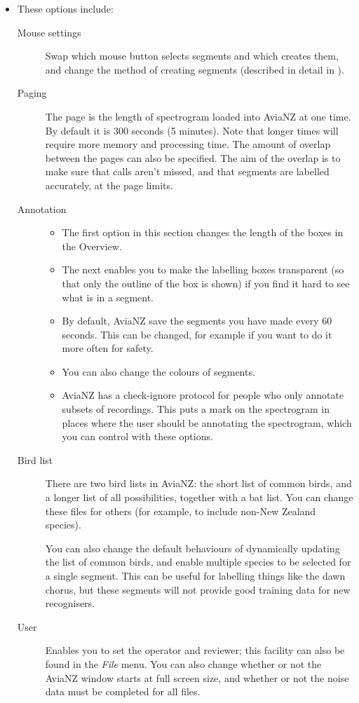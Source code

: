 \documentclass{scrartcl}
\begin{document}
\begin{itemize}
\item These options include:
\begin{description}
	\item[Mouse settings] Swap which mouse button selects segments and which creates them, and change the method of creating segments (described in detail in ).
\item[Paging] The page is the length of spectrogram loaded into AviaNZ at one time. By default it is 300 seconds (5 minutes). Note that longer times will require more memory and processing time. The amount of overlap between the pages can also be specified. The aim of the overlap is to make sure that calls aren't missed, and that segments are labelled accurately, at the page limits. 
\item[Annotation] 
\begin{itemize}
\item The first option in this section changes the length of the boxes in the Overview. 
\item The next enables you to make the labelling boxes transparent (so that only the outline of the box is shown) if you find it hard to see what is in a segment. 
\item By default, AviaNZ save the segments you have made every 60 seconds. This can be changed, for example if you want to do it more often for safety. 
\item You can also change the colours of segments.
\item AviaNZ has a check-ignore protocol for people who only annotate subsets of recordings. This puts a mark on the spectrogram in places where the user should be annotating the spectrogram, which you can control with these options.
\end{itemize}
\item[Bird list] There are two bird lists in AviaNZ: the short list of common birds, and a longer list of all possibilities, together with a bat list. You can change these files for others (for example, to include non-New Zealand species). %

You can also change the default behaviours of dynamically updating the list of common birds, and enable multiple species to be selected for a single segment. This can be useful for labelling things like the dawn chorus, but these segments will not provide good training data for new recognisers. 
\item[User] Enables you to set the operator and reviewer; this facility can also be found in the \textit{File} menu. You can also change whether or not the AviaNZ window starts at full screen size, and whether or not the noise data must be completed for all files. 
\end{description}
\end{itemize}
\end{document}
